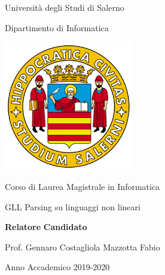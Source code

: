 %
\begin{titlepage}
\begin{center}
	{\LARGE Università degli Studi di Salerno}\par
	\vspace{0.5cm}
	{\Large Dipartimento di Informatica}\par
	\vspace{1cm}
	\includegraphics[height=160pt]{logounisa.png}\par
	\vspace{1cm}
	{\Large Corso di Laurea Magistrale in Informatica}\par
	\vspace{2cm}
	{\Huge GLL Parsing su linguaggi non lineari}\par
	\vspace{2cm}
\end{center}
\begin{flushleft}
	{\large\textbf{Relatore}}
	\hspace{8cm}
	{\large\textbf{Candidato}}\par
	\vspace{0.1cm}
	{\large Prof. Gennaro Costagliola}
	\hspace{4.5cm}
	{\large Mazzotta Fabio}
\end{flushleft}	
	\vspace{3.5cm}
\begin{center}
	{\large Anno Accademico 2019-2020}
\end{center}
\end{titlepage}
%
